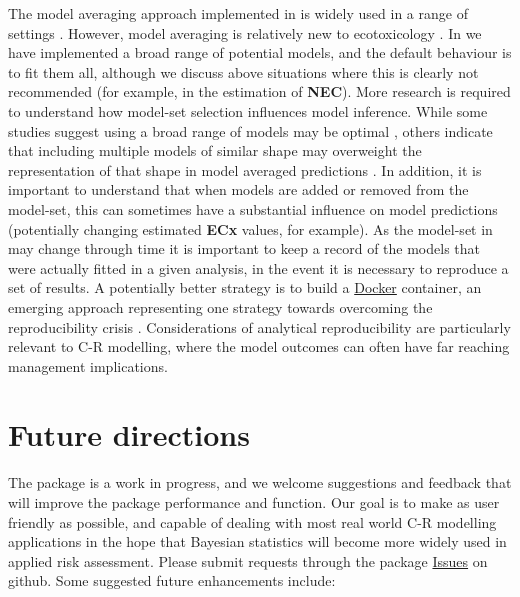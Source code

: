 \documentclass[
]{jss}
\begin{document}
The model averaging approach implemented in  is widely
used in a range of settings \citep[in ecology for example, see][ for a
thorough review]{Dormann2018}. However, model averaging is relatively
new to ecotoxicology \citep[but see, for
example,][]{Shao2014, Thorley2018, fox2020, Wheeler2009}. In
 we have implemented a broad range of potential models,
and the default behaviour is to fit them all, although we discuss above
situations where this is clearly not recommended (for example, in the
estimation of \textbf{NEC}). More research is required to understand how
model-set selection influences model inference. While some studies
suggest using a broad range of models may be optimal
\citep{Wheeler2009}, others indicate that including multiple models of
similar shape may overweight the representation of that shape in model
averaged predictions \citep{fox2020}. In addition, it is important to
understand that when models are added or removed from the model-set,
this can sometimes have a substantial influence on model predictions
(potentially changing estimated \textbf{ECx} values, for example). As
the model-set in  may change through time it is important
to keep a record of the models that were actually fitted in a given
analysis, in the event it is necessary to reproduce a set of results. A
potentially better strategy is to build a
\href{https://docs.docker.com/get-docker/}{Docker} container, an
emerging approach representing one strategy towards overcoming the
reproducibility crisis \citep{Baker2016}. Considerations of analytical
reproducibility are particularly relevant to C-R modelling, where the
model outcomes can often have far reaching management implications.

\hypertarget{future-directions}{%
\section{Future directions}\label{future-directions}}

The  package is a work in progress, and we welcome
suggestions and feedback that will improve the package performance and
function. Our goal is to make  as user friendly as
possible, and capable of dealing with most real world C-R modelling
applications in the hope that Bayesian statistics will become more
widely used in applied risk assessment. Please submit requests through
the package \href{https://github.com/open-AIMS/bayesnec/issues}{Issues}
on github. Some suggested future enhancements include:
\end{document}
